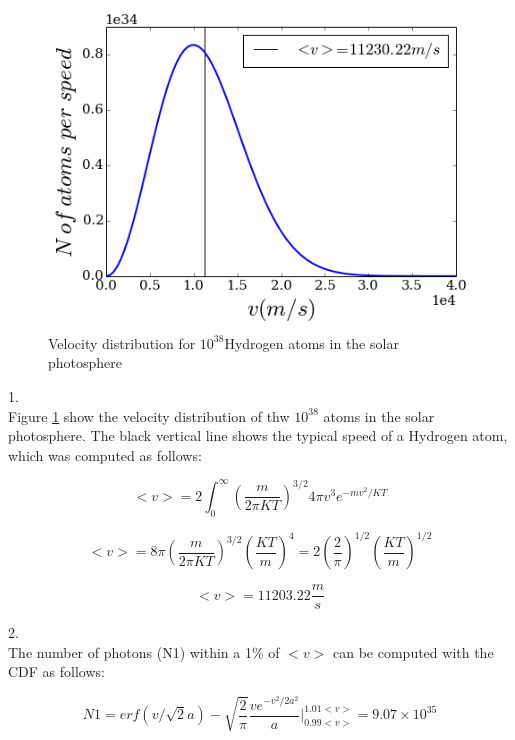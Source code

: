 \documentclass[12pt]{article}
\begin{document}
\begin{figure}
\centering
\includegraphics[scale=0.5]{mbv.png}
\caption{Velocity distribution for $10^{38}$Hydrogen atoms 
in the solar photosphere\label{mbv}}
\end{figure}

1. \\
Figure \ref{mbv} show the velocity distribution of thw $10^{38}$ atoms
in the solar photosphere. The black vertical line shows the typical
speed of a Hydrogen atom, which was computed as follows:

\begin{equation}
<v> = 2\int_0^{\infty} \left( \dfrac{m}{2\pi KT}  \right)^{3/2} 4\pi v^3 e^{-mv^2/KT}
\end{equation}

\begin{equation}
<v> = 8\pi \left( \dfrac{m}{2\pi KT}  \right)^{3/2} \left(\dfrac{KT}{m}\right)^4
= 2 \left( \dfrac{2}{\pi} \right)^{1/2} \left( \dfrac{KT}{m}  \right)^{1/2}
\end{equation}

\begin{equation}
<v> = 11203.22 \dfrac{m}{s}
\end{equation}

2. \\ 

The number of photons (N1) within a 1\% of $<v>$ can be computed with the CDF as follows:


\begin{equation}
N1 = erf(v/\sqrt{2}a) - \sqrt{\dfrac{2}{\pi}} \dfrac{v e^{-v^2/2a^2}}{a} \Bigg|_{0.99<v>}^{1.01<v>}  = 9.07\times 10^{35} 
\end{equation}
\end{document}
